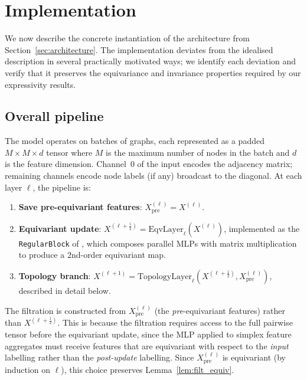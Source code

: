 
\section{Implementation}
\label{sec:implementation}

We now describe the concrete instantiation of the architecture from Section~\ref{sec:architecture}. The implementation deviates from the idealised description in several practically motivated ways; we identify each deviation and verify that it preserves the equivariance and invariance properties required by our expressivity results.

\subsection{Overall pipeline}

The model operates on batches of graphs, each represented as a padded $M \times M \times d$ tensor where $M$ is the maximum number of nodes in the batch and $d$ is the feature dimension. Channel~$0$ of the input encodes the adjacency matrix; remaining channels encode node labels (if any) broadcast to the diagonal. At each layer $\ell$, the pipeline is:

\begin{enumerate}
    \item \textbf{Save pre-equivariant features}: $X^{(\ell)}_{\mathrm{pre}} = X^{(\ell)}$.
    \item \textbf{Equivariant update}: $X^{(\ell+\frac{1}{2})} = \mathrm{EqvLayer}_\ell(X^{(\ell)})$, implemented as the \texttt{RegularBlock} of \cite{maron2019provably}, which composes parallel MLPs with matrix multiplication to produce a $2$nd-order equivariant map.
    \item \textbf{Topology branch}: $X^{(\ell+1)} = \mathrm{TopologyLayer}_\ell(X^{(\ell+\frac{1}{2})}, X^{(\ell)}_{\mathrm{pre}})$, described in detail below.
\end{enumerate}

\noindent The filtration is constructed from $X^{(\ell)}_{\mathrm{pre}}$ (the \emph{pre}-equivariant features) rather than $X^{(\ell+\frac{1}{2})}$. This is because the filtration requires access to the full pairwise tensor before the equivariant update, since the MLP applied to simplex feature aggregates must receive features that are equivariant with respect to the \emph{input} labelling rather than the \emph{post-update} labelling. Since $X^{(\ell)}_{\mathrm{pre}}$ is equivariant (by induction on $\ell$), this choice preserves Lemma~\ref{lem:filt_equiv}.

